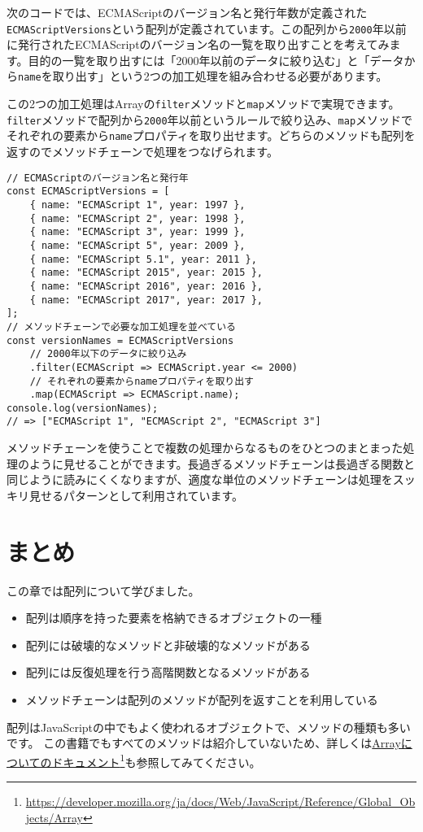 次のコードでは、ECMAScriptのバージョン名と発行年数が定義された\texttt{ECMAScriptVersions}という配列が定義されています。この配列から\texttt{2000}年以前に発行されたECMAScriptのバージョン名の一覧を取り出すことを考えてみます。目的の一覧を取り出すには「2000年以前のデータに絞り込む」と「データから\texttt{name}を取り出す」という2つの加工処理を組み合わせる必要があります。

この2つの加工処理はArrayの\texttt{filter}メソッドと\texttt{map}メソッドで実現できます。\texttt{filter}メソッドで配列から\texttt{2000}年以前というルールで絞り込み、\texttt{map}メソッドでそれぞれの要素から\texttt{name}プロパティを取り出せます。どちらのメソッドも配列を返すのでメソッドチェーンで処理をつなげられます。

\begin{lstlisting}
// ECMAScriptのバージョン名と発行年
const ECMAScriptVersions = [
    { name: "ECMAScript 1", year: 1997 },
    { name: "ECMAScript 2", year: 1998 },
    { name: "ECMAScript 3", year: 1999 },
    { name: "ECMAScript 5", year: 2009 },
    { name: "ECMAScript 5.1", year: 2011 },
    { name: "ECMAScript 2015", year: 2015 },
    { name: "ECMAScript 2016", year: 2016 },
    { name: "ECMAScript 2017", year: 2017 },
];
// メソッドチェーンで必要な加工処理を並べている
const versionNames = ECMAScriptVersions
    // 2000年以下のデータに絞り込み
    .filter(ECMAScript => ECMAScript.year <= 2000)
    // それぞれの要素からnameプロパティを取り出す
    .map(ECMAScript => ECMAScript.name);
console.log(versionNames); 
// => ["ECMAScript 1", "ECMAScript 2", "ECMAScript 3"]
\end{lstlisting}

メソッドチェーンを使うことで複数の処理からなるものをひとつのまとまった処理のように見せることができます。長過ぎるメソッドチェーンは長過ぎる関数と同じように読みにくくなりますが、適度な単位のメソッドチェーンは処理をスッキリ見せるパターンとして利用されています。

\hypertarget{conclusion}{%
\section{まとめ}\label{conclusion}}

この章では配列について学びました。

\begin{itemize}
\item
  配列は順序を持った要素を格納できるオブジェクトの一種
\item
  配列には破壊的なメソッドと非破壊的なメソッドがある
\item
  配列には反復処理を行う高階関数となるメソッドがある
\item
  メソッドチェーンは配列のメソッドが配列を返すことを利用している
\end{itemize}

\enlargethispage{\baselineskip}配列はJavaScriptの中でもよく使われるオブジェクトで、メソッドの種類も多いです。
この書籍でもすべてのメソッドは紹介していないため、詳しくは\href{https://developer.mozilla.org/ja/docs/Web/JavaScript/Reference/Global_Objects/Array}{Arrayについてのドキュメント}\footnote{\url{https://developer.mozilla.org/ja/docs/Web/JavaScript/Reference/Global_Objects/Array}}も参照してみてください。
